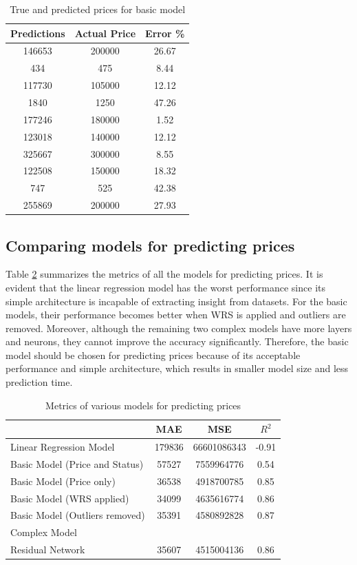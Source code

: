 \documentclass[12pt,twoside]{report}
\begin{document}
\begin{table}[!htbp]
	\centering
	\caption{ True and predicted prices for basic model}
	\label{resnet_prediction_price}
	\begin{tabular}{| c | c | c |}
		\hline
		Predictions & Actual Price & Error \% \\
		\hline
		146653 & 200000 & 26.67 \\
		\hline
		434 & 475 & 8.44 \\
		\hline
		117730 & 105000 & 12.12 \\
		\hline
		1840 & 1250 & 47.26 \\
		\hline
		177246 & 180000 & 1.52 \\
		\hline
		123018 & 140000 & 12.12 \\
		\hline
		325667 & 300000 & 8.55 \\ 
		\hline
		122508 & 150000 & 18.32 \\
		\hline
		747 & 525 & 42.38 \\
		\hline
		255869 & 200000 & 27.93 \\
		\hline
	\end{tabular}
\end{table}

\subsection{Comparing models for predicting prices}
Table \ref{metrics_basic_model} summarizes the metrics of all the models for predicting prices. It is evident that the linear regression model has the worst performance since its simple architecture is incapable of extracting insight from datasets. For the basic models, their performance becomes better when WRS is applied and outliers are removed. Moreover, although the remaining two complex models have more layers and neurons, they cannot improve the accuracy significantly. Therefore, the basic model should be chosen for predicting prices because of its acceptable performance and simple architecture, which results in smaller model size and less prediction time. 
\begin{table}[!htbp]
	\centering
	\caption{Metrics of various models for predicting prices}
	\label{metrics_basic_model}
	\begin{tabular}{| l | c | c | c |}
		\hline
		& MAE & MSE & $R^2$ \\
		\hline
		Linear Regression Model & 179836 & 66601086343 & -0.91 \\
		\hline
		Basic Model (Price and Status) & 57527 & 7559964776 & 0.54 \\
		\hline
		Basic Model (Price only) & 36538 & 4918700785 & 0.85 \\
		\hline
		Basic Model (WRS applied)& 34099 & 4635616774 & 0.86 \\
		\hline
		Basic Model (Outliers removed) & 35391 & 4580892828 & 0.87 \\
		\hline
		Complex Model & & & \\
		\hline
		Residual Network & 35607 & 4515004136 & 0.86 \\
		\hline
	\end{tabular}
\end{table}
\end{document}
